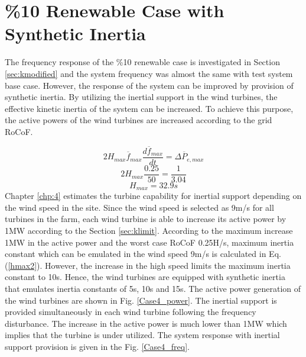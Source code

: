 \section{\%10 Renewable Case with Synthetic Inertia}
The frequency response of the \%10 renewable case is investigated in Section \ref{sec:kmodified} and the system frequency was almost the same with test system base case. However, the response of the system can be improved by provision of synthetic inertia. By utilizing the inertial support in the wind turbines, the effective kinetic inertia of the system can be increased. To achieve this purpose, the active powers of the wind turbines are increased according to the grid RoCoF. \par
\begin{equation}
\label{hmax}
2H_{max}\overline{f}_{max}\frac{d\overline{f}_{max}}{dt}=\Delta\overline{P}_{e,max}
\end{equation}
\begin{equation}
\label{hmax1}
2H_{max}\frac{0.25}{50}=\frac{1}{3.04}
\end{equation}
\begin{equation}
\label{hmax2}
H_{max}=32.9s
\end{equation}
Chapter \ref{chp:4} estimates the turbine capability for inertial support depending on the wind speed in the site. Since the wind speed is selected as 9m/s for all turbines in the farm, each wind turbine is able to increase its active power by 1MW according to the Section \ref{sec:klimit}. According to the maximum increase 1MW in the active power and the worst case RoCoF 0.25H/s, maximum inertia constant which can be emulated in the wind speed 9m/s is calculated in Eq. (\ref{hmax2}). However, the increase in the high speed limits the maximum inertia constant to 10s. Hence, the wind turbines are equipped with synthetic inertia that emulates inertia constants of 5s, 10s and 15s. The active power generation of the wind turbines are shown in Fig. \ref{Case4_power}. The inertial support is provided simultaneously in each wind turbine following the frequency disturbance. The increase in the active power is much lower than 1MW which implies that the turbine is under utilized. The system response with inertial support provision is given in the Fig. \ref{Case4_freq}.\par
